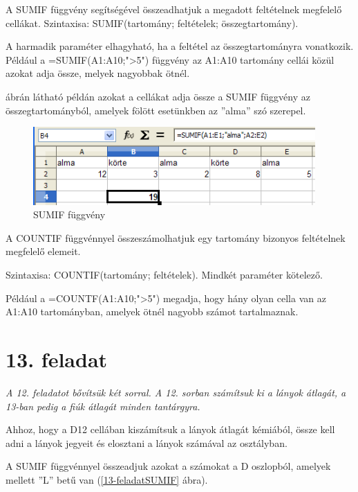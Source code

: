 A SUMIF függvény segítségével összeadhatjuk a megadott
feltételnek megfelelő cellákat. Szintaxisa: SUMIF(tartomány;
feltételek; összegtartomány).

A harmadik paraméter elhagyható, ha a feltétel az
összegtartományra vonatkozik. Például a
=SUMIF(A1:A10;">5")
függvény az A1:A10 tartomány cellái közül azokat adja
össze, melyek nagyobbak ötnél.

 ábrán látható példán azokat a cellákat adja össze
a SUMIF függvény az összegtartományból, amelyek fölött
esetünkben az ''alma'' szó
szerepel.

\begin{figure}[!h]
\begin{center}
\includegraphics[width=10.799cm]{oocalcv1-img73.png}
\caption{SUMIF függvény}\label{SUMIFFüggvény}
\end{center}
\end{figure}

A COUNTIF függvénnyel összeszámolhatjuk egy tartomány bizonyos
feltételnek megfelelő elemeit.

Szintaxisa: COUNTIF(tartomány; feltételek). Mindkét paraméter
kötelező.

Például a =COUNTF(A1:A10;">5") megadja,
hogy hány olyan cella van az A1:A10 tartományban, amelyek ötnél
nagyobb számot tartalmaznak.


\section{13. feladat}
{\itshape
A 12. feladatot bővítsük két sorral. A 12. sorban
számítsuk ki a lányok átlagát, a 13-ban pedig a fiúk
átlagát minden tantárgyra.}

Ahhoz, hogy a D12 cellában kiszámítsuk a lányok átlagát
kémiából, össze kell adni a lányok jegyeit és elosztani a
lányok számával az osztályban.

A SUMIF függvénnyel összeadjuk azokat a számokat a D
oszlopból, amelyek mellett ''L''
betű van (\ref{13-feladatSUMIF} ábra).

